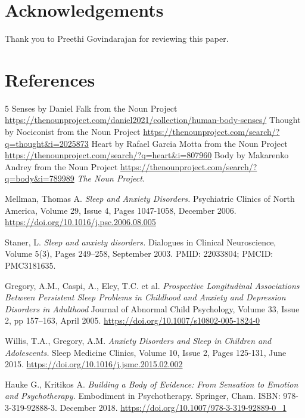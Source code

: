 \documentclass[a4paper, amsfonts, amssymb, amsmath, reprint, showkeys, nofootinbib, twoside]{revtex4-1}
\begin{document}
\section*{Acknowledgements}

Thank you to Preethi Govindarajan for reviewing this paper.


\section*{References}

\begin{thebibliography}{99}

  5 Senses by Daniel Falk from the Noun Project
  \url{https://thenounproject.com/daniel2021/collection/human-body-senses/}
  Thought by Nociconist from the Noun Project
  \url{https://thenounproject.com/search/?q=thought&i=2025873}
  Heart by Rafael Garcia Motta from the Noun Project
  \url{https://thenounproject.com/search/?q=heart&i=807960}
  Body by Makarenko Andrey from the Noun Project
  \url{https://thenounproject.com/search/?q=body&i=789989}
  \textit{The Noun Project}.

  Mellman, Thomas A.
  \textit{Sleep and Anxiety Disorders.}
  Psychiatric Clinics of North America, Volume 29, Issue 4, Pages 1047-1058, December 2006.
  \url{https://doi.org/10.1016/j.psc.2006.08.005}

  Staner, L.
  \textit{Sleep and anxiety disorders.}
  Dialogues in Clinical Neuroscience, Volume 5(3), Pages 249–258, September 2003.
  PMID: 22033804; PMCID: PMC3181635.

  Gregory, A.M., Caspi, A., Eley, T.C. et al.
  \textit{Prospective Longitudinal Associations Between Persistent Sleep Problems in
    Childhood and Anxiety and Depression Disorders in Adulthood}
  Journal of Abnormal Child Psychology, Volume 33, Issue 2, pp 157–163, April 2005.
  \url{https://doi.org/10.1007/s10802-005-1824-0}

  Willis, T.A., Gregory, A.M.
  \textit{Anxiety Disorders and Sleep in Children and Adolescents.}
  Sleep Medicine Clinics, Volume 10, Issue 2, Pages 125-131, June 2015.
  \url{https://doi.org/10.1016/j.jsmc.2015.02.002}

  Hauke G., Kritikos A.
  \textit{Building a Body of Evidence: From Sensation to Emotion and Psychotherapy.}
  Embodiment in Psychotherapy. Springer, Cham.
  ISBN: 978-3-319-92888-3. December 2018.
  \url{https://doi.org/10.1007/978-3-319-92889-0_1}


\end{thebibliography}
\end{document}
